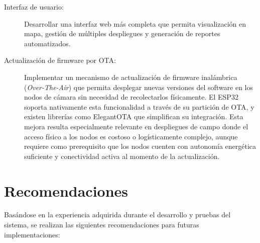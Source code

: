 \documentclass[a4paper, 12pt]{report}
\begin{document}
\begin{description}
  \item[Interfaz de usuario:] Desarrollar una interfaz web más completa
    que permita visualización en mapa, gestión de múltiples despliegues
    y generación de reportes automatizados.

  \item[Actualización de firmware por OTA:] Implementar un mecanismo de
    actualización de firmware inalámbrica (\textit{Over-The-Air}) que
    permita desplegar nuevas versiones del software en los nodos de
    cámara sin necesidad de recolectarlos físicamente. El ESP32 soporta
    nativamente esta funcionalidad a través de su partición de OTA,
    y existen librerías como ElegantOTA que simplifican su integración.
    Esta mejora resulta especialmente relevante en despliegues de campo
    donde el acceso físico a los nodos es costoso o logísticamente
    complejo, aunque requiere como prerequisito que los nodos cuenten
    con autonomía energética suficiente y conectividad activa al momento
    de la actualización.
\end{description}

\section{Recomendaciones}

Basándose en la experiencia adquirida durante el desarrollo y pruebas
del sistema, se realizan las siguientes recomendaciones para futuras
implementaciones:
\end{document}
